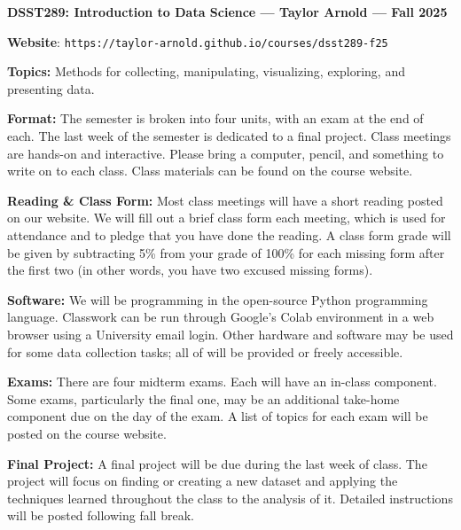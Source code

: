 \documentclass[11pt, a4paper]{article}
\begin{document}
\begin{center}
\textbf{DSST289: Introduction to Data Science --- Taylor Arnold --- Fall 2025}
\end{center}

\vspace{0.5cm}

\textbf{Website}: \texttt{https://taylor-arnold.github.io/courses/dsst289-f25}

\bigskip

\textbf{Topics:}
Methods for collecting, manipulating, visualizing, exploring, and presenting
data.

\bigskip

\textbf{Format:}
The semester is broken into four units, with an exam at the end of each. The
last week of the semester is dedicated to a final project. Class meetings are
hands-on and interactive. Please bring a computer, pencil, and something to
write on to each class. Class materials can be found on the course website.

\bigskip

\textbf{Reading \& Class Form:}
Most class meetings will have a short reading posted on our website.
We will fill out a brief class form each meeting, which is used for attendance
and to pledge that you have done the reading. A class form grade will be given
by subtracting 5\% from your grade of 100\% for each missing form after the first
two (in other words, you have two excused missing forms).

\bigskip

\textbf{Software:}
We will be programming in the open-source Python programming language. 
Classwork can be run through Google's Colab environment in a web browser using
a University email login. Other hardware and software may be used for some data collection tasks; all of will be provided or freely accessible.

\bigskip

\textbf{Exams:}
There are four midterm exams. Each will have an in-class component. Some exams,
particularly the final one, may be an additional take-home component due on
the day of the exam. A list of topics for each exam will be posted on the course
website.

\bigskip

\textbf{Final Project:}
A final project will be due during the last week of class. The project will
focus on finding or creating a new dataset and applying the techniques learned
throughout the class to the analysis of it. Detailed instructions will
be posted following fall break.
\end{document}
